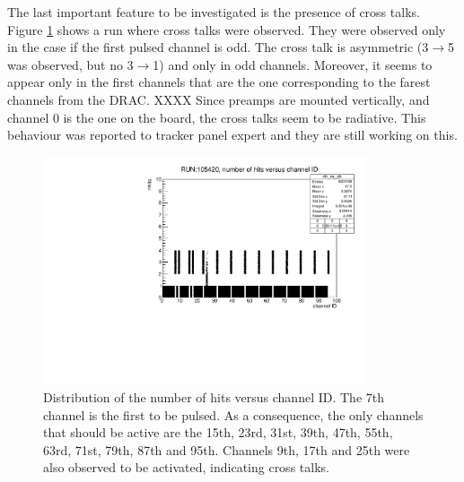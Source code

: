 The last important feature to be investigated is the presence of cross talks. Figure \ref{fig:cross} shows a run where cross talks were observed.
They were observed only in the case if the first pulsed channel is odd. The cross talk is asymmetric (3$\rightarrow$5 was observed, but no 3$\rightarrow$1) and only in odd channels.
Moreover, it seems to appear only in the first channels that are the one corresponding to the farest channels from the DRAC. XXXX
Since preamps are mounted vertically, and channel 0 is the one on the board, the cross talks seem to be radiative.
This behaviour was reported to tracker panel expert and they are still working on this.
\begin{figure}[!h]
  \centering
  \includegraphics[width=0.85\textwidth]{figures/pdf/run105420_nh_vs_ch.pdf}
  \caption{Distribution of the number of hits versus channel ID. The 7th channel is the first to be pulsed. 
  As a consequence, the only channels that should be active are the 15th, 23rd, 31st, 39th, 47th, 55th, 63rd, 71st, 79th, 87th and 95th. 
  Channels 9th, 17th and 25th were also observed to be activated, indicating cross talks.}
 \label{fig:cross}
\end{figure}
